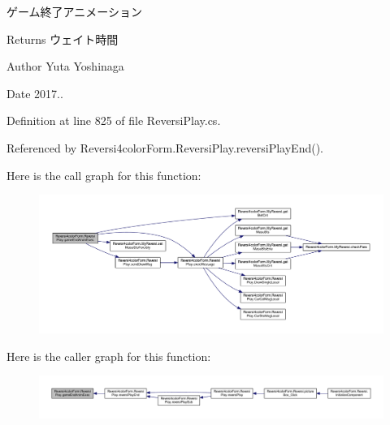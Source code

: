 ゲーム終了アニメーション 

\begin{DoxyReturn}{Returns}
ウェイト時間 
\end{DoxyReturn}
\begin{DoxyAuthor}{Author}
Yuta Yoshinaga 
\end{DoxyAuthor}
\begin{DoxyDate}{Date}
2017.. 
\end{DoxyDate}


Definition at line 825 of file Reversi\+Play.\+cs.



Referenced by Reversi4color\+Form.\+Reversi\+Play.\+reversi\+Play\+End().

Here is the call graph for this function\+:\nopagebreak
\begin{figure}[H]
\begin{center}
\leavevmode
\includegraphics[width=350pt]{class_reversi4color_form_1_1_reversi_play_a1f415a175312ca4d39d36685d3404311_cgraph}
\end{center}
\end{figure}
Here is the caller graph for this function\+:\nopagebreak
\begin{figure}[H]
\begin{center}
\leavevmode
\includegraphics[width=350pt]{class_reversi4color_form_1_1_reversi_play_a1f415a175312ca4d39d36685d3404311_icgraph}
\end{center}
\end{figure}
\mbox{\label{class_reversi4color_form_1_1_reversi_play_a037f282ad4aeb2807a0108cbbb82fd02}} 
